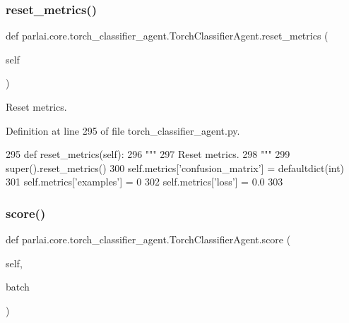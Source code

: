 \subsubsection{\texorpdfstring{reset\+\_\+metrics()}{reset\_metrics()}}
{\footnotesize\ttfamily def parlai.\+core.\+torch\+\_\+classifier\+\_\+agent.\+Torch\+Classifier\+Agent.\+reset\+\_\+metrics (\begin{DoxyParamCaption}\item[{}]{self }\end{DoxyParamCaption})}

\begin{DoxyVerb}Reset metrics.
\end{DoxyVerb}
 

Definition at line 295 of file torch\+\_\+classifier\+\_\+agent.\+py.


\begin{DoxyCode}
295     \textcolor{keyword}{def }reset\_metrics(self):
296         \textcolor{stringliteral}{"""}
297 \textcolor{stringliteral}{        Reset metrics.}
298 \textcolor{stringliteral}{        """}
299         super().reset\_metrics()
300         self.metrics[\textcolor{stringliteral}{'confusion\_matrix'}] = defaultdict(int)
301         self.metrics[\textcolor{stringliteral}{'examples'}] = 0
302         self.metrics[\textcolor{stringliteral}{'loss'}] = 0.0
303 
\end{DoxyCode}
\mbox{\label{classparlai_1_1core_1_1torch__classifier__agent_1_1TorchClassifierAgent_a04e97e79ef7e497c0927c10b31e42337}} 
\subsubsection{\texorpdfstring{score()}{score()}}
{\footnotesize\ttfamily def parlai.\+core.\+torch\+\_\+classifier\+\_\+agent.\+Torch\+Classifier\+Agent.\+score (\begin{DoxyParamCaption}\item[{}]{self,  }\item[{}]{batch }\end{DoxyParamCaption})}

